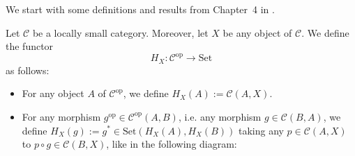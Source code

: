 We start with some definitions and results from Chapter~4 in \cite{basic_cat}.
\begin{definition}[4.1.16] Let $\mathcal{C}$ be a locally small category. Moreover, let $X$ be any object of $\mathcal{C}$. We define the functor
\[H_X:\mathcal{C}^{\mathrm{op}}\to\mathrm{Set}\]
as follows:
\begin{itemize}
\item For any object $A$ of $\mathcal{C}^{\mathrm{op}}$, we define $H_X(A):=\mathcal{C}(A,X)$.
\item For any morphism $g^{\mathrm{op}}\in\mathcal{C}^{\mathrm{op}}(A,B)$, i.e. any morphism $g\in\mathcal{C}(B,A)$, we define $H_X(g):=g^*\in\mathrm{Set}(H_X(A),H_X(B))$ taking any $p\in\mathcal{C}(A,X)$ to $p\circ g\in\mathcal{C}(B,X)$, like in the following diagram:
\begin{center}
\end{center}
\end{itemize}
\end{definition}

